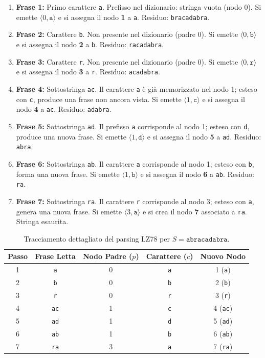 \begin{enumerate}
  \item \textbf{Frase 1:} Primo carattere \texttt{a}. Prefisso nel dizionario: stringa vuota (nodo 0). Si emette $\langle 0, \texttt{a} \rangle$ e si assegna il nodo \textbf{1} a \texttt{a}. Residuo: \texttt{bracadabra}.
  \item \textbf{Frase 2:} Carattere \texttt{b}. Non presente nel dizionario (padre 0). Si emette $\langle 0, \texttt{b} \rangle$ e si assegna il nodo \textbf{2} a \texttt{b}. Residuo: \texttt{racadabra}.
  \item \textbf{Frase 3:} Carattere \texttt{r}. Non presente nel dizionario (padre 0). Si emette $\langle 0, \texttt{r} \rangle$ e si assegna il nodo \textbf{3} a \texttt{r}. Residuo: \texttt{acadabra}.
  \item \textbf{Frase 4:} Sottostringa \texttt{ac}. Il carattere \texttt{a} \`e gi\`a memorizzato nel nodo 1; esteso con \texttt{c}, produce una frase non ancora vista. Si emette $\langle 1, \texttt{c} \rangle$ e si assegna il nodo \textbf{4} a \texttt{ac}. Residuo: \texttt{adabra}.
  \item \textbf{Frase 5:} Sottostringa \texttt{ad}. Il prefisso \texttt{a} corrisponde al nodo 1; esteso con \texttt{d}, produce una nuova frase. Si emette $\langle 1, \texttt{d} \rangle$ e si assegna il nodo \textbf{5} a \texttt{ad}. Residuo: \texttt{abra}.
  \item \textbf{Frase 6:} Sottostringa \texttt{ab}. Il carattere \texttt{a} corrisponde al nodo 1; esteso con \texttt{b}, forma una nuova frase. Si emette $\langle 1, \texttt{b} \rangle$ e si assegna il nodo \textbf{6} a \texttt{ab}. Residuo: \texttt{ra}.
  \item \textbf{Frase 7:} Sottostringa \texttt{ra}. Il carattere \texttt{r} corrisponde al nodo 3; esteso con \texttt{a}, genera una nuova frase. Si emette $\langle 3, \texttt{a} \rangle$ e si crea il nodo \textbf{7} associato a \texttt{ra}. Stringa esaurita.
\end{enumerate}

\begin{table}[H]
\centering
\small
\caption{Tracciamento dettagliato del parsing LZ78 per $S = \texttt{abracadabra}$.}
\label{tab:tracciamento-lz78}
\begin{tabular}{ccccc}
\toprule
\textbf{Passo} & \textbf{Frase Letta} & \textbf{Nodo Padre ($p$)} & \textbf{Carattere ($c$)} & \textbf{Nuovo Nodo} \\
\midrule
1 & \texttt{a}  & 0 & \texttt{a} & 1 (\texttt{a}) \\
2 & \texttt{b}  & 0 & \texttt{b} & 2 (\texttt{b}) \\
3 & \texttt{r}  & 0 & \texttt{r} & 3 (\texttt{r}) \\
4 & \texttt{ac} & 1 & \texttt{c} & 4 (\texttt{ac}) \\
5 & \texttt{ad} & 1 & \texttt{d} & 5 (\texttt{ad}) \\
6 & \texttt{ab} & 1 & \texttt{b} & 6 (\texttt{ab}) \\
7 & \texttt{ra} & 3 & \texttt{a} & 7 (\texttt{ra}) \\
\bottomrule
\end{tabular}
\end{table}

